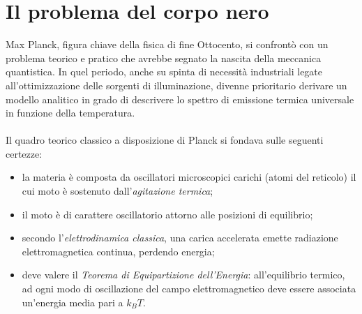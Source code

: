 \documentclass[a4paper,11pt]{report}
\begin{document}
\section{Il problema del corpo nero}
Max Planck, figura chiave della fisica di fine Ottocento, si confrontò con un problema teorico e pratico che avrebbe segnato la nascita della meccanica quantistica. In quel periodo, anche su spinta di necessità industriali legate all'ottimizzazione delle sorgenti di illuminazione, divenne prioritario derivare un modello analitico in grado di descrivere lo spettro di emissione termica universale in funzione della temperatura.\\
\\
Il quadro teorico classico a disposizione di Planck si fondava sulle seguenti certezze:
\begin{itemize}
    \item la materia è composta da oscillatori microscopici carichi (atomi del reticolo) il cui moto è sostenuto dall'\textit{agitazione termica};
    \item il moto è di carattere oscillatorio attorno alle posizioni di equilibrio;
    \item secondo l'\textit{elettrodinamica classica}, una carica accelerata emette radiazione elettromagnetica continua, perdendo energia;
    \item deve valere il \textit{Teorema di Equipartizione dell'Energia}: all'equilibrio termico, ad ogni modo di oscillazione del campo elettromagnetico deve essere associata un'energia media pari a $k_B T$.
\end{itemize}
\end{document}
